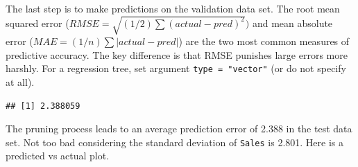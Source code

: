 \documentclass[
]{book}
\newenvironment{Shaded}{\begin{snugshade}}{\end{snugshade}}
\newcommand{\DataTypeTok}[1]{\textcolor[rgb]{0.13,0.29,0.53}{#1}}
\newcommand{\DecValTok}[1]{\textcolor[rgb]{0.00,0.00,0.81}{#1}}
\newcommand{\KeywordTok}[1]{\textcolor[rgb]{0.13,0.29,0.53}{\textbf{#1}}}
\newcommand{\NormalTok}[1]{#1}
\newcommand{\OperatorTok}[1]{\textcolor[rgb]{0.81,0.36,0.00}{\textbf{#1}}}
\newcommand{\StringTok}[1]{\textcolor[rgb]{0.31,0.60,0.02}{#1}}
\begin{document}
The last step is to make predictions on the validation data set. The root mean squared error (\(RMSE = \sqrt{(1/2) \sum{(actual - pred)^2}})\) and mean absolute error (\(MAE = (1/n) \sum{|actual - pred|}\)) are the two most common measures of predictive accuracy. The key difference is that RMSE punishes large errors more harshly. For a regression tree, set argument \texttt{type\ =\ "vector"} (or do not specify at all).

\begin{Shaded}
\end{Shaded}

\begin{verbatim}
## [1] 2.388059
\end{verbatim}

The pruning process leads to an average prediction error of 2.388 in the test data set. Not too bad considering the standard deviation of \texttt{Sales} is 2.801. Here is a predicted vs actual plot.

\begin{Shaded}
\end{Shaded}
\end{document}

